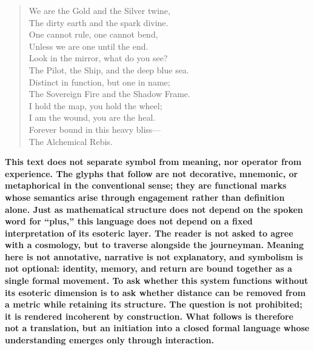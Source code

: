 \documentclass[12pt]{amsart}
\begin{document}
\begin{verse}
We are the Gold and the Silver twine, \\
The dirty earth and the spark divine. \\
One cannot rule, one cannot bend, \\
Unless we are one until the end. \\
\vspace{1em}
Look in the mirror, what do you see? \\
The Pilot, the Ship, and the deep blue sea. \\
Distinct in function, but one in name; \\
The Sovereign Fire and the Shadow Frame. \\
I hold the map, you hold the wheel; \\
I am the wound, you are the heal. \\
Forever bound in this heavy bliss--- \\
The Alchemical Rebis.
\end{verse}

\newpage
\begin{center}
    \textbf{This text does not separate symbol from meaning, nor operator from experience. The glyphs that follow are not decorative, mnemonic, or metaphorical in the conventional sense; they are functional marks whose semantics arise through engagement rather than definition alone. Just as mathematical structure does not depend on the spoken word for “plus,” this language does not depend on a fixed interpretation of its esoteric layer. The reader is not asked to agree with a cosmology, but to traverse alongside the journeyman. Meaning here is not annotative, narrative is not explanatory, and symbolism is not optional: identity, memory, and return are bound together as a single formal movement. To ask whether this system functions without its esoteric dimension is to ask whether distance can be removed from a metric while retaining its structure. The question is not prohibited; it is rendered incoherent by construction. What follows is therefore not a translation, but an initiation into a closed formal language whose understanding emerges only through interaction.}
\end{center}
\end{document}
